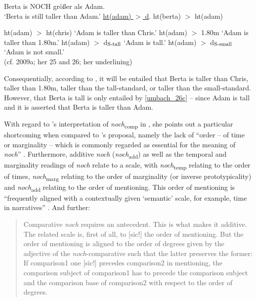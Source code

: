 \documentclass[output=paper
,modfonts
,nonflat]{langsci/langscibook}
\begin{document}
\ea\ea\label{umbach_25} Berta is NOCH größer als Adam. \\ {`Berta is still taller than Adam.'}
\ex    \label{umbach_repr_of_25} \underline{ht(adam) $>$ d}. ht(berta) $>$ ht(adam)  
\z\z

\ea \label{umbachs_context_degrees} \ea ht(adam) $>$ ht(chris) \hspace{22.5pt} `Adam is taller than Chris.'\label{umbach_26a}
\ex ht(adam) $>$ 1.80m          \hspace{33.5pt} `Adam is taller than 1.80m.'
\ex ht(adam) $>$ d$_{\textnormal{\scriptsize{S-tall}}}$   \hspace{35pt} `Adam is tall.' \label{umbach_26c}
\ex ht(adam) $>$ d$_{\textnormal{\scriptsize{S-small}}}$  \hspace{28.5pt} `Adam is not small.' \\ (cf. \citeauthor{umbach2009a_comp} 2009a; her 25 and 26; her underlining)
  \z\z

\noindent Consequentially, according to \citeauthor{umbach2009a_comp}, it will be entailed that Berta is taller than Chris, taller than 1.80m, taller than the tall-standard, or taller than the small-standard. However, that Berta is tall is only entailed by \ref{umbach_26c} -- since Adam is tall and it is asserted that Berta is taller than Adam.

With regard to \citeauthor{umbach2009a_comp}'s interpretation of \textit{noch}\textsubscript{comp} in , she points out a particular shortcoming when compared to \citeauthor{koenig1977}'s \citeyearpar{koenig1977} proposal, namely the lack of ``order -- of time or marginality -- which is commonly regarded as essential for the meaning of \textit{noch}'' \citet[12]{umbach2009a_comp}. Furthermore, additive \textit{noch} (\textit{noch}\textsubscript{add}) as well as the temporal and marginality readings of \textit{noch} relate to a scale, with \textit{noch}\textsubscript{temp} relating to the order of times, \textit{noch}\textsubscript{marg} relating to the order of marginality (or inverse prototypicality) and \textit{noch}\textsubscript{add} relating to the order of mentioning. This order of mentioning is ``frequently aligned with a contextually given `semantic' scale, for example, time in narratives'' \citet[12]{umbach2009a_comp}. And further:


    \begin{quote}
    Comparative \textit{noch} requires an antecedent. This is what makes it additive. The related scale is, first of all, to [sic!] the order of mentioning. But the order of mentioning is aligned to the order of degrees given by the adjective of the \textit{noch}-comparative such that the latter preserves the former: If comparison1 one [sic!] precedes comparison2 in mentioning, the comparison subject of comparison1 has to precede the comparison subject and the comparison base of comparison2 with respect to the order of degrees. \citet[13]{umbach2009a_comp}
    \end{quote}
\end{document}
